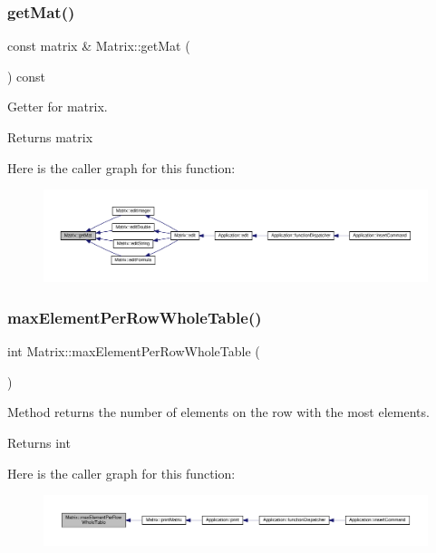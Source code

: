 \subsubsection{\texorpdfstring{get\+Mat()}{getMat()}}
{\footnotesize\ttfamily const matrix \& Matrix\+::get\+Mat (\begin{DoxyParamCaption}{ }\end{DoxyParamCaption}) const}

Getter for matrix. \begin{DoxyReturn}{Returns}
matrix 
\end{DoxyReturn}
Here is the caller graph for this function\+:
\nopagebreak
\begin{figure}[H]
\begin{center}
\leavevmode
\includegraphics[width=350pt]{class_matrix_a52d82641f52304c9b6525747cd7f960c_icgraph}
\end{center}
\end{figure}
\mbox{\label{class_matrix_a8620c5426a31cf8fe0072df32bb3f65d}} 
\subsubsection{\texorpdfstring{max\+Element\+Per\+Row\+Whole\+Table()}{maxElementPerRowWholeTable()}}
{\footnotesize\ttfamily int Matrix\+::max\+Element\+Per\+Row\+Whole\+Table (\begin{DoxyParamCaption}{ }\end{DoxyParamCaption})\hspace{0.3cm}{\ttfamily [private]}}

Method returns the number of elements on the row with the most elements. \begin{DoxyReturn}{Returns}
int 
\end{DoxyReturn}
Here is the caller graph for this function\+:
\nopagebreak
\begin{figure}[H]
\begin{center}
\leavevmode
\includegraphics[width=350pt]{class_matrix_a8620c5426a31cf8fe0072df32bb3f65d_icgraph}
\end{center}
\end{figure}
\mbox{\label{class_matrix_a60dac9b70e73a12d2adb32d6be9ff65d}} 
